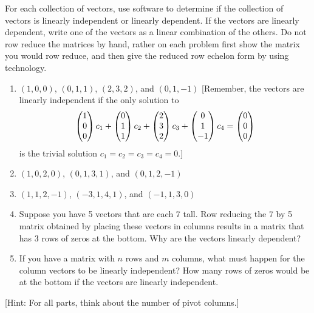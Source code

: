 \begin{problem}
For each collection of vectors, use software to determine if the collection of vectors is linearly independent or linearly dependent.  If the vectors are linearly dependent, write one of the vectors as a linear combination of the others. Do not row reduce the matrices by hand, rather on each problem first show the matrix you would row reduce, and then give the reduced row echelon form by using technology.
\begin{enumerate}
 \item $(1,0,0)$, $(0,1,1)$, $(2,3,2)$, and $(0,1,-1)$ 
[Remember, the vectors are linearly independent if the only solution to 
$$\begin{pmatrix} 1\\0\\0 \end{pmatrix}c_1+\begin{pmatrix} 0\\1\\1 \end{pmatrix}c_2+\begin{pmatrix} 2\\3\\2 \end{pmatrix}c_3+\begin{pmatrix} 0\\1\\-1 \end{pmatrix}c_4=\begin{pmatrix} 0\\0\\0 \end{pmatrix}$$ is the trivial solution $c_1=c_2=c_3=c_4=0$.]
 \item $(1,0,2,0)$, $(0,1,3,1)$, and $(0,1,2,-1)$
 \item $(1,1,2,-1)$, $(-3,1,4,1)$, and $(-1,1,3,0)$
 \item Suppose you have 5 vectors that are each 7 tall. Row reducing the 7 by 5 matrix obtained by placing these vectors in columns results in a matrix that has 3 rows of zeros at the bottom.  Why are the vectors linearly dependent?
 \item If you have a matrix with $n$ rows and $m$ columns, what must happen for the column vectors to be linearly independent?  How many rows of zeros would be at the bottom if the vectors are linearly independent. 
\end{enumerate}
[Hint: For all parts, think about the number of pivot columns.]
\end{problem}





